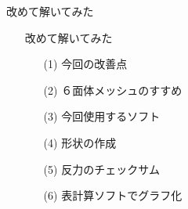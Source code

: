 \begin{frame}{改めて解いてみた}
  \begin{itemize}
      \item[] 改めて解いてみた
      \begin{itemize}[itemsep=1.3ex, leftmargin=1cm]
        \item[(1)]  今回の改善点
	\item[(2)]  ６面体メッシュのすすめ
	\item[(3)]  今回使用するソフト
	\item[(4)]  形状の作成
	\item[(5)]  反力のチェックサム
	\item[(6)]  表計算ソフトでグラフ化
      \end{itemize}
  \end{itemize}
\end{frame}

